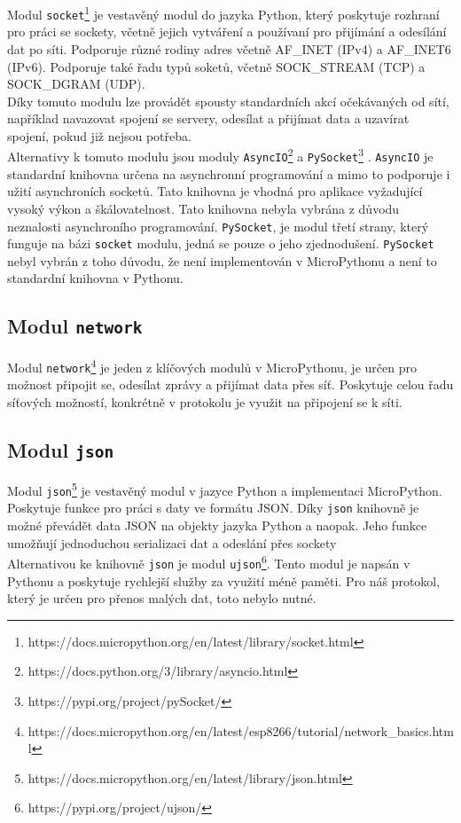 \documentclass[12pt]{report}			%
\begin{document}
Modul \texttt{socket}\footnote{https://docs.micropython.org/en/latest/library/socket.html} je vestavěný modul do jazyka Python, který poskytuje rozhraní pro práci se sockety, včetně jejich vytváření a používaní pro přijímání a odesílání dat po síti. Podporuje různé rodiny adres včetně AF\_INET (IPv4) a AF\_INET6 (IPv6). Podporuje také řadu typů soketů, včetně SOCK\_STREAM (TCP) a SOCK\_DGRAM (UDP).
\\
Díky tomuto modulu lze provádět spousty standardních akcí očekávaných od sítí, například navazovat spojení se servery, odesílat a přijímat data a uzavírat spojení, pokud již nejsou potřeba. 
\\
Alternativy k tomuto modulu jsou moduly 
\texttt{AsyncIO}\footnote{https://docs.python.org/3/library/asyncio.html} a 
\texttt{PySocket}\footnote{https://pypi.org/project/pySocket/}
. \texttt{AsyncIO} je standardní knihovna určena na asynchronní programování a mimo to podporuje i užití asynchroních socketů. Tato knihovna je vhodná pro aplikace vyžadující vysoký výkon a škálovatelnost. Tato knihovna nebyla vybrána z důvodu neznalosti asynchroního programování. \texttt{PySocket}, je modul třetí strany, který funguje na bázi \texttt{socket} modulu, jedná se pouze o jeho zjednodušení. \texttt{PySocket} nebyl vybrán z toho důvodu, že není implementován v MicroPythonu a není to standardní knihovna v Pythonu. 

\subsection{Modul \texttt{network}}

Modul \texttt{network}\footnote{https://docs.micropython.org/en/latest/esp8266/tutorial/network\_basics.html} je jeden z klíčových modulů v MicroPythonu, je určen pro možnost připojit se, odesílat zprávy a přijímat data přes síť. Poskytuje celou řadu síťových možností, konkrétně v protokolu je využit na připojení se k síti. 

\subsection{Modul \texttt{json}}
Modul \texttt{json}\footnote{https://docs.micropython.org/en/latest/library/json.html} je vestavěný modul v jazyce Python a  implementaci MicroPython. Poskytuje funkce pro práci s daty ve formátu JSON. Díky \texttt{json} knihovně je možné převádět data JSON na objekty jazyka Python a naopak. Jeho funkce umožňují jednoduchou serializaci dat a odeslání přes sockety 
\\
Alternativou ke knihovně \texttt{json} je modul \texttt{ujson}\footnote{https://pypi.org/project/ujson/}. Tento modul je napsán v Pythonu a poskytuje rychlejší služby za využití méně paměti. Pro náš protokol, který je určen pro přenos malých dat, toto nebylo nutné.
\end{document}
